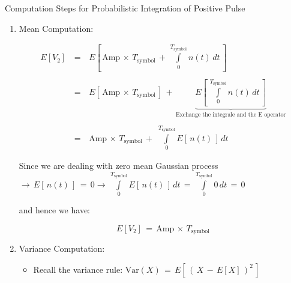 \documentclass{Beamer}
\begin{document}
\begin{frame}[t,allowframebreaks]{Computation Steps for Probabilistic Integration of Positive Pulse}
\begin{enumerate}
Since $Z_2$ is Gaussian, we now need to compute its mean $E[Z_2]$ and its variance $\text{Var}(Z_2)$.\\

Some Rules regarding mean computation:


	\begin{itemize}
	\item  Mean of a constant is a constant $ \leftrightarrow \, E[\text{constant}] \, = \, \text{constant}$
	
	\item Mean of a sum is the sum of the means $ \leftrightarrow \,  \,E[\, X \, + \, Y \, ] \, = \, E[X] \, + \, E[Y]$
	\end{itemize}




\newpage
\item Mean Computation:

$$\begin{array}{rcl}
E[V_2] \, &=& \, E \left[\, \text{Amp}\, \times \, T_{\text{symbol}} \, + \,   \displaystyle\int\limits_{0}^{T_{\text{symbol}}}n(t) \, dt   \,\right] \\ \\
		&=& \, E \left[\, \text{Amp}\, \times \, T_{\text{symbol}} \,\right]  \, + \, \underbrace{E \left[\, \displaystyle\int\limits_{0}^{T_{\text{symbol}}}n(t)  \, dt \,\right]}_{\text{Exchange the integrale and the E operator}}   \\ \\
		&=& \, \text{Amp}\, \times \, T_{\text{symbol}} \, + \, \,  \displaystyle\int\limits_{0}^{T_{\text{symbol}}}   E \left[\, n(t)  \,\right]  \, dt 
\end{array}$$

Since we are dealing with zero mean Gaussian process $\rightarrow \, E \left[\, n(t)  \,\right] \, = \, 0 \rightarrow \, \displaystyle\int\limits_{0}^{T_{\text{symbol}}}   E \left[\, n(t)  \,\right]  \, dt \, = \, \displaystyle\int\limits_{0}^{T_{\text{symbol}}} 0 \,  dt \, = \, 0$

and hence we have:

\begin{equation}
E[V_2] \, = \,  \text{Amp}\, \times \, T_{\text{symbol}}
\end{equation}


\newpage

\item Variance Computation:

\begin{itemize}
\item Recall the variance rule: $\text{Var}(X) \, = \, E \left[\,  \left(\, X \, - \, E[X]\, \right)^2  \,\right]$
\end{itemize}


\end{enumerate}
\end{frame}
\end{document}

